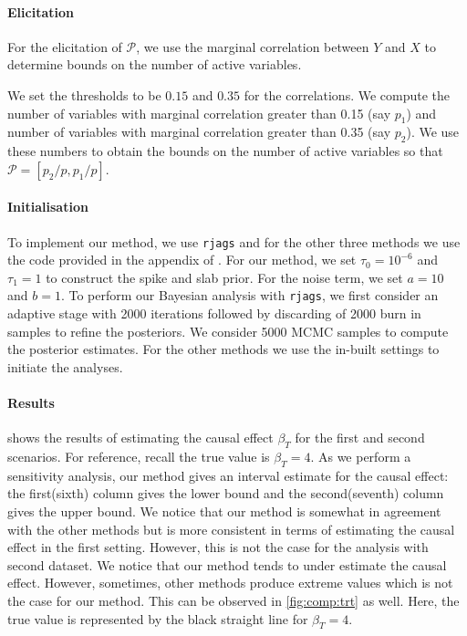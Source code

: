 \documentclass[preprint,12pt]{elsarticle}
\begin{document}
\paragraph{Elicitation}
For the
elicitation of $\mathcal{P}$, we use the marginal correlation between 
$Y$ and $X$ to determine bounds on the number of active variables.

We set the thresholds to be $0.15$ and $0.35$ for the correlations.
We compute the
number of variables with marginal correlation greater than 0.15
(say $p_1$) and number of variables with  marginal 
correlation greater than 0.35 (say $p_2$). 
We use these numbers to obtain the bounds on the number of active
variables so that $\mathcal{P}=[p_2/p , p_1/p]$.

\paragraph{Initialisation} 
To implement our method, we use \texttt{rjags} and for the other three
methods we use the code provided in the appendix of \citep{koch2020}.
For our method, we set $\tau_0=10^{-6}$ and $\tau_1=1$ to construct the
spike and slab prior.
For the noise term, we set $a=10$ and $b=1$.
To perform 
our Bayesian analysis with \texttt{rjags}, we first consider an adaptive 
stage with 2000 iterations followed by discarding of 2000 burn in samples 
to refine the posteriors. We consider 5000 MCMC samples to compute the
posterior estimates. For the other methods we use the in-built settings 
to initiate the analyses.

\paragraph{Results}
 shows the results of estimating the causal effect $\beta_T$
for the first and second scenarios.
For reference, recall the true value is $\beta_T=4$. 
As we perform a sensitivity analysis,
our method gives an interval estimate for the causal effect:
the first(sixth) column gives the lower bound
and the second(seventh) column gives the upper bound. We notice that our method is 
somewhat in agreement with the other methods but is more consistent
in terms of estimating the causal effect in the first setting. However, this is not the
case for the analysis with second dataset. We notice that our method tends to under
estimate the causal effect. However, sometimes, other methods produce extreme 
values which is not the case for our method. This can be observed in \cref{fig:comp:trt} as well. Here, the true 
value is represented by the black straight line for $\beta_T = 4$. 
\end{document}
